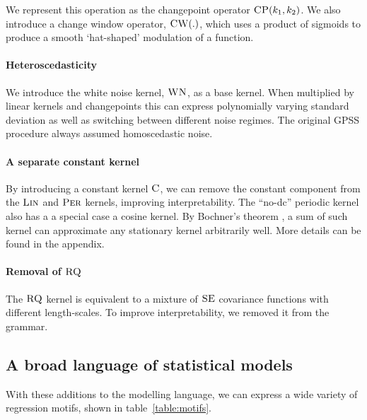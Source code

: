 \documentclass{article}
\begin{document}
We represent this operation as the changepoint operator ${\textsc{CP}}(k_1, k_2)$.
We also introduce a change window operator, ${\textsc{CW}}(.)$, which uses a product of sigmoids to produce a smooth `hat-shaped' modulation of a function.

\paragraph{Heteroscedasticity}

We introduce the white noise kernel, ${\textsc{WN}}$, as a base kernel.
When multiplied by linear kernels and changepoints this can express polynomially varying standard deviation as well as switching between different noise regimes.
The original GPSS procedure always assumed homoscedastic noise.



\paragraph{A separate constant kernel}
By introducing a constant kernel ${\textsc{C}}$, we can remove the constant component from the ${\textsc{Lin}}$ and ${\textsc{Per}}$ kernels, improving interpretability.  The ``no-dc'' periodic kernel also has a a special case a cosine kernel.  By Bochner's theorem \citep{bochner1959lectures}, a sum of such kernel can approximate any stationary kernel arbitrarily well.
More details can be found in the appendix.


\paragraph{Removal of ${\textsc{RQ}}$}
The ${\textsc{RQ}}$ kernel is equivalent to a mixture of ${\textsc{SE}}$ covariance functions with different length-scales.
To improve interpretability, we removed it from the grammar.


\subsection{A broad language of statistical models}

With these additions to the modelling language, we can express a wide variety of regression motifs, shown in table~\ref{table:motifs}.
\end{document}
